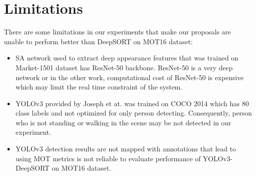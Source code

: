 \section{Limitations}
\hspace{0.45cm}There are some limitations in our experiments that make our proposals are unable to perform better than DeepSORT\cite{Wojke2017simple}
on MOT16 dataset:
\begin{itemize}
    \item \acrshort{SA} network used to extract deep appearance features that was trained on Market-1501 dataset has ResNet-50\cite{He_2016_CVPR} backbone. 
    ResNet-50\cite{He_2016_CVPR} is a very deep network or in the other work, computational cost of ResNet-50\cite{He_2016_CVPR} is expensive which may limit the real time constraint of the system.
    \item YOLOv3 provided by Joseph et at.\cite{yolov3} was trained on COCO 2014 which has 80 class labels and not optimized for only person detecting. Consequently, person who is not standing or walking in the scene may be not detected in our experiment.
    \item YOLOv3 detection results are not mapped with annotations that lead to using MOT metrics\cite{Milan2016MOT16AB} is not reliable
    to evaluate performance of YOLOv3-DeepSORT on MOT16 dataset.
\end{itemize}


